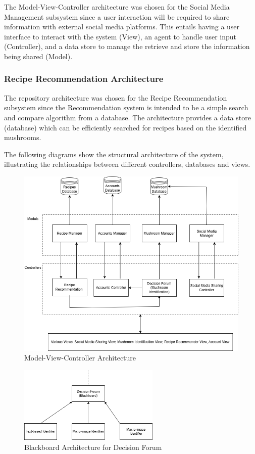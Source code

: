 \documentclass[]{article}
\begin{document}
The Model-View-Controller architecture was chosen for the Social Media Management subsystem since 
a user interaction will be required to share information with external social media platforms. This entails
having a user interface to interact with the system (View), an agent to handle user input (Controller), and 
a data store to manage the retrieve and store the information being shared (Model).

\subsubsection{Recipe Recommendation Architecture}

The repository architecture was chosen for the Recipe Recommendation subsystem since the Recommendation
system is intended to be a simple search and compare algorithm from a database. The architecture provides
a data store (database) which can be efficiently searched for recipes based on the identified mushrooms.

\vspace{4pt}
The following diagrams show the structural architecture of the system, illustrating the 
relationships between different controllers, databases and views.

\begin{figure}[H]
	\centering
	\includegraphics[width=1\textwidth]{sysarch.png}
	\caption{Model-View-Controller Architecture}
	\label{fig:sys-arch}
\end{figure}

\begin{figure}[H]
	\centering
	\includegraphics[width=0.6\textwidth]{blackboard-df.png}
	\caption{Blackboard Architecture for Decision Forum}
	\label{fig:blackboard}
\end{figure}
\end{document}
